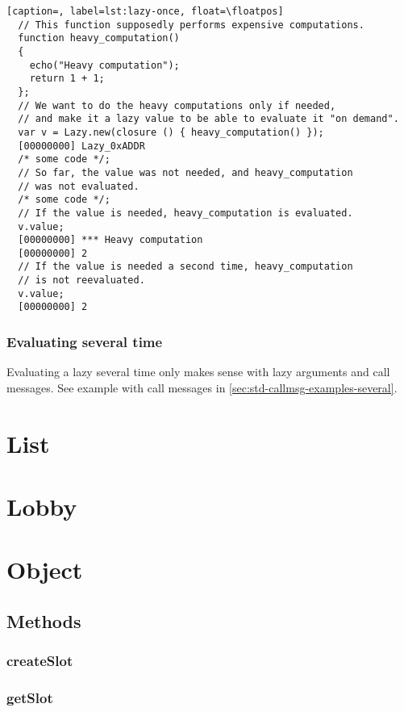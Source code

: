 \documentclass[openright,twoside,12pt]{report}
\begin{document}
\begin{lstlisting}[caption=, label=lst:lazy-once, float=\floatpos]
  // This function supposedly performs expensive computations.
  function heavy_computation()
  {
    echo("Heavy computation");
    return 1 + 1;
  };
  // We want to do the heavy computations only if needed,
  // and make it a lazy value to be able to evaluate it "on demand".
  var v = Lazy.new(closure () { heavy_computation() });
  [00000000] Lazy_0xADDR
  /* some code */;
  // So far, the value was not needed, and heavy_computation
  // was not evaluated.
  /* some code */;
  // If the value is needed, heavy_computation is evaluated.
  v.value;
  [00000000] *** Heavy computation
  [00000000] 2
  // If the value is needed a second time, heavy_computation
  // is not reevaluated.
  v.value;
  [00000000] 2
\end{lstlisting}

\subsubsection{Evaluating several time}

Evaluating a lazy several time only makes sense with lazy arguments
and call messages. See example with call messages in
\autoref{sec:std-callmsg-examples-several}.

\section{List}


\section{Lobby}
\section{Object}
\label{sec:std-object}

\subsection{Methods}

\subsubsection{createSlot}
\label{sec:std-object-createslot}

\subsubsection{getSlot}
\label{sec:std-object-getslot}
\end{document}
